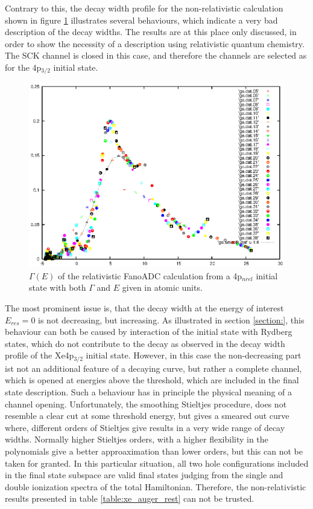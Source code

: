 Contrary to this, the decay width profile for the non-relativistic calculation
shown in figure \ref{figure:Xe4pnrel_Gamma_profile} illustrates several
behaviours, which indicate a very bad description of the decay widths.
The results are at this place only discussed, in order to show the necessity
of a description using relativistic quantum chemistry. The \ac{SCK} channel
is closed in this case, and therefore the channels are selected as for the
4p$_{3/2}$ initial state.

\begin{figure}[htb]
  \centering
  \includegraphics[scale=1.0]{pics/Xe4p_nrel_gammae.eps}
  \caption{$\Gamma(E)$ of the relativistic FanoADC calculation from a 4p$_{nrel}$
           initial state with both $\Gamma$ and $E$ given in atomic units.
           }
  \label{figure:Xe4pnrel_Gamma_profile}
\end{figure}

The most prominent issue is, that the decay width at the energy of interest
$E_{res}=0$ is not decreasing, but increasing. As illustrated in section
\ref{section:}, this behaviour can both be caused by interaction of
the initial state with Rydberg states, which do not contribute to the decay
as observed in the decay width profile of the Xe4p$_{3/2}$ initial state.
However, in this case the non-decreasing part ist not an additional feature
of a decaying curve, but rather a complete channel, which is opened at energies
above the threshold, which are included in the final state description. Such
a behaviour has in principle the physical meaning of a channel opening.
Unfortunately, the smoothing Stieltjes procedure, does not resemble a clear
cut at some threshold energy, but gives a smeared out curve where, different
orders of Stieltjes give results in a very wide range of decay widths.
Normally higher Stieltjes orders, with a higher flexibility in the polynomials give
a better approaximation than lower orders, but this can not be taken for granted.
In this particular situation, all two hole configurations included in the
final state subspace are valid final states judging from the single and
double ionization spectra of the total Hamiltonian. Therefore, the
non-relativistic results presented in table \ref{table:xe_auger_rest} can
not be trusted.

